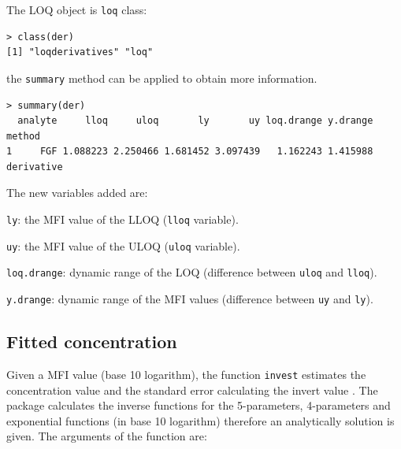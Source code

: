 \documentclass[11pt]{article}\usepackage[]{graphicx}\usepackage[]{color}
\makeatletter
\newenvironment{kframe}{%
 \def\at@end@of@kframe{}%
 \ifinner\ifhmode%
  \def\at@end@of@kframe{\end{minipage}}%
  \begin{minipage}{\columnwidth}%
 \fi\fi%
 \def\FrameCommand##1{\hskip\@totalleftmargin \hskip-\fboxsep
 \colorbox{shadecolor}{##1}\hskip-\fboxsep
     \hskip-\linewidth \hskip-\@totalleftmargin \hskip\columnwidth}%
 \MakeFramed {\advance\hsize-\width
   \@totalleftmargin\z@ \linewidth\hsize
   \@setminipage}}%
 {\par\unskip\endMakeFramed%
 \at@end@of@kframe}
\newenvironment{knitrout}{}{} %
\newenvironment{itemize*}%
    {\begin{itemize}%
        \setlength{\itemsep}{-0.35cm}%
        \setlength{\parskip}{10pt}}%
{\end{itemize}}
\makeatother
\begin{document}
\noindent The LOQ object is {\tt loq} class:

\begin{knitrout}
\color{fgcolor}\begin{kframe}
\begin{verbatim}
> class(der)
[1] "loqderivatives" "loq"           
\end{verbatim}
\end{kframe}
\end{knitrout}

\noindent the {\tt summary} method can be applied to obtain more information.

\begin{knitrout}
\color{fgcolor}\begin{kframe}
\begin{verbatim}
> summary(der)
  analyte     lloq     uloq       ly       uy loq.drange y.drange     method
1     FGF 1.088223 2.250466 1.681452 3.097439   1.162243 1.415988 derivative
\end{verbatim}
\end{kframe}
\end{knitrout}

\noindent The new variables added are:
\begin{itemize*}
    \item {\tt ly}: the MFI value of the LLOQ ({\tt lloq} variable).
    \item {\tt uy}: the MFI value of the ULOQ ({\tt uloq} variable).
    \item {\tt loq.drange}: dynamic range of the LOQ (difference between {\tt uloq}
    and {\tt lloq}).
    \item {\tt y.drange}: dynamic range of the MFI values (difference between {\tt uy}
    and {\tt ly}).
\end{itemize*}

\subsection{Fitted concentration}
Given a MFI value (base 10 logarithm), the function {\tt invest} 
estimates the concentration value and the standard error 
calculating the invert value \cite{INLR}. The package calculates 
the inverse functions for the 5-parameters, 4-parameters and exponential 
functions (in base 10 logarithm) therefore an analytically solution 
is given. The arguments of the function are:
\end{document}
